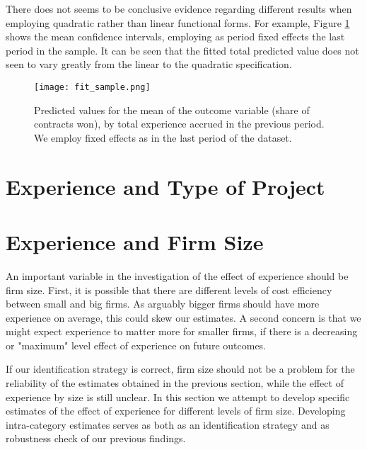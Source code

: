 \begin{table}[!htbp]
{}

\end{table}


There does not seems to be conclusive evidence regarding different results when employing quadratic rather than linear functional forms. For example, Figure \ref{fig:fit_sample} shows the mean confidence intervals, employing as period fixed effects the last period in the sample. It can be seen that the fitted total predicted value does not seen to vary greatly from the linear to the quadratic specification.

\begin{figure}[H]
        \centering
        \texttt{[image: fit\_sample.png]}
        \caption{ \small Predicted values for the mean of the outcome variable (share of contracts won), by total experience accrued in the previous period. We employ fixed effects as in the last period of the dataset.}
        \label{fig:fit_sample}
    \end{figure}




\section{Experience and Type of Project}

\section{Experience and Firm Size}
An important variable in the investigation of the effect of experience should be firm size. First, it is possible that there are different levels of cost efficiency between small and big firms. As arguably bigger firms should have more experience on average, this could skew our estimates. A second concern is that we might expect experience to matter more for smaller firms, if there is a decreasing or "maximum" level effect of experience on future outcomes.

If our identification strategy is correct, firm size should not be a problem for the reliability of the estimates obtained in the previous section, while the effect of experience by size is still unclear. In this section we attempt to develop specific estimates of the effect of experience for different levels of firm size. Developing intra-category estimates serves as both as an identification strategy and as  robustness check of our previous findings.

